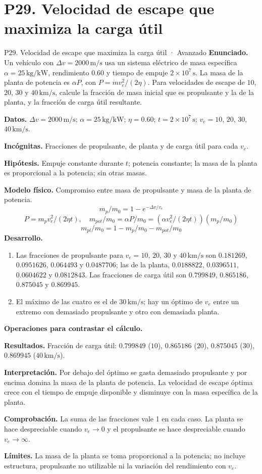 \section{P29. Velocidad de escape que maximiza la carga útil}
\begin{studiumworked}{P29. Velocidad de escape que maximiza la carga útil · Avanzado}
\textbf{Enunciado.} Un vehículo con $\Delta v=2000\,\mathrm{m/s}$ usa un sistema eléctrico de masa específica $\alpha=25\,\mathrm{kg/kW}$, rendimiento $0.60$ y tiempo de empuje $2\times10^7\,\mathrm s$. La masa de la planta de potencia es $\alpha P$, con $P=\dot mv_e^2/(2\eta)$. Para velocidades de escape de $10$, $20$, $30$ y $40\,\mathrm{km/s}$, calcule la fracción de masa inicial que es propulsante y la de la planta, y la fracción de carga útil resultante.

\textbf{Datos.} $\Delta v=2000\,\mathrm{m/s}$; $\alpha=25\,\mathrm{kg/kW}$; $\eta=0.60$; $t=2\times10^7\,\mathrm s$; $v_e=10$, $20$, $30$, $40\,\mathrm{km/s}$.

\textbf{Incógnitas.} Fracciones de propulsante, de planta y de carga útil para cada $v_e$.

\textbf{Hipótesis.} Empuje constante durante $t$; potencia constante; la masa de la planta es proporcional a la potencia; sin otras masas.

\textbf{Modelo físico.} Compromiso entre masa de propulsante y masa de la planta de potencia.
\[m_p/m_0=1-e^{-\Delta v/v_e}\]
\[P=m_pv_e^2/(2\eta t),\quad m_{pot}/m_0=\alpha P/m_0=(\alpha v_e^2/(2\eta t))(m_p/m_0)\]
\[m_{pl}/m_0=1-m_p/m_0-m_{pot}/m_0\]
\textbf{Desarrollo.}
\begin{enumerate}
\item Las fracciones de propulsante para $v_e=10$, $20$, $30$ y $40\,\mathrm{km/s}$ son $0.181269$, $0.0951626$, $0.064493$ y $0.0487706$; las de la planta, $0.0188822$, $0.0396511$, $0.0604622$ y $0.0812843$. Las fracciones de carga útil son $0.799849$, $0.865186$, $0.875045$ y $0.869945$.
\item El máximo de las cuatro es el de $30\,\mathrm{km/s}$; hay un óptimo de $v_e$ entre un extremo con demasiado propulsante y otro con demasiada planta.
\end{enumerate}
\textbf{Operaciones para contrastar el cálculo.}

\textbf{Resultados.} Fracción de carga útil: $0.799849$ ($10$), $0.865186$ ($20$), $0.875045$ ($30$), $0.869945$ ($40\,\mathrm{km/s}$).

\textbf{Interpretación.} Por debajo del óptimo se gasta demasiado propulsante y por encima domina la masa de la planta de potencia. La velocidad de escape óptima crece con el tiempo de empuje disponible y disminuye con la masa específica de la planta.

\textbf{Comprobación.} La suma de las fracciones vale 1 en cada caso. La planta se hace despreciable cuando $v_e\to0$ y el propulsante se hace despreciable cuando $v_e\to\infty$.

\textbf{Límites.} La masa de la planta se toma proporcional a la potencia; no incluye estructura, propulsante no utilizable ni la variación del rendimiento con $v_e$.
\end{studiumworked}
